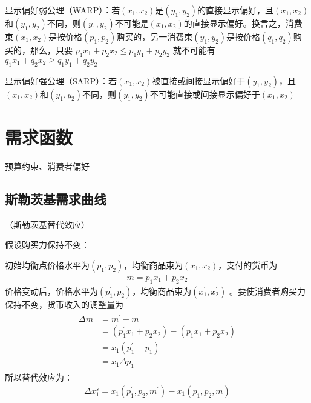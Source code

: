 \documentclass[12pt]{book}
\begin{document}
显示偏好弱公理（WARP）：若$(x_1,x_2)$是$(y_1,y_2)$的直接显示偏好，且$(x_1,x_2)$和$(y_1,y_2)$不同，则$(y_1,y_2)$不可能是$(x_1,x_2)$的直接显示偏好。换言之，消费束$(x_1,x_2)$是按价格$(p_1,p_2)$购买的，另一消费束$(y_1,y_2)$是按价格$(q_1,q_2)$购买的，那么，只要
$p_{1}x_{1}+p_{2}x_{2}\leqslant p_{1}y_{1}+p_{2}y_{2}$
就不可能有
$q_{1}x_{1}+q_{2}x_{2}\geqslant q_{1}y_{1}+q_{2}y_{2}$

显示偏好强公理（SARP）：若$(x_1,x_2)$被直接或间接显示偏好于$(y_1,y_2)$，且$(x_1,x_2)$和$(y_1,y_2)$不同，则$(y_1,y_2)$不可能直接或间接显示偏好于$(x_1,x_2)$





\section{需求函数}



预算约束、消费者偏好





\subsection{斯勒茨基需求曲线}

（斯勒茨基替代效应）

假设购买力保持不变：

初始均衡点价格水平为$(p_1,p_2)$，均衡商品束为$(x_1,x_2)$，支付的货币为
\begin{gather*}
    m=p_{1}x_{1}+p_{2}x_{2}
\end{gather*}
价格变动后，价格水平为$(p_{1}^{\prime},p_2)$，均衡商品束为$(x_{1}^{\prime},x_{2}^{\prime})$
。要使消费者购买力保持不变，货币收入的调整量为
\begin{gather*}
\begin{aligned}
    \Delta m 
    &= m^{\prime}-m \\
    &= (p_{1}^{\prime}x_{1}+p_{2}x_{2}) - (p_{1}x_{1}+p_{2}x_{2}) \\
    &= x_{1}(p_{1}^{\prime}-p_{1}) \\
    &= x_{1}\Delta p_{1}
\end{aligned}  
\end{gather*}
所以替代效应为：
\begin{gather*}
    \Delta x_{1}^{s} = x_{1}(p^{\prime}_{1},p_{2},m^{\prime}) - x_{1}(p_{1},p_{2},m)
\end{gather*}
\end{document}
